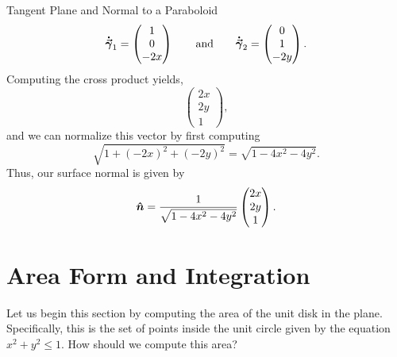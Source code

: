 \begin{ex}{Tangent Plane and Normal to a Paraboloid}
                                        \[
                                        \boldsymbol{\dot{\vec{\gamma}}}_1 = \begin{pmatrix} 1 \\ 0 \\ -2x \end{pmatrix} \qquad \textrm{and} \qquad \boldsymbol{\dot{\vec{\gamma}}}_2 = \begin{pmatrix} 0 \\ 1 \\ -2y \end{pmatrix}.
                                        \]
                                        Computing the cross product yields,
                                        \[
                                        \begin{pmatrix} 2x \\ 2y \\ 1 \end{pmatrix},
                                        \]
                                        and we can normalize this vector by first computing
                                        \[
                                        \sqrt{1+(-2x)^2+(-2y)^2} = \sqrt{1-4x^2-4y^2}.
                                        \]
                                        Thus, our surface normal is given by
                                        \[
                                        \boldsymbol{\hat{n}} = \frac{1}{\sqrt{1-4x^2-4y^2}} \begin{pmatrix} 2x \\ 2y \\ 1 \end{pmatrix}.
                                        \]
                                        \end{ex}
                                      
                                      
                                      \section{Area Form and Integration}
                                      
                                      Let us begin this section by computing the area of the unit disk in the plane.  Specifically, this is the set of points inside the unit circle given by the equation $x^2+y^2\leq 1$.  How should we compute this area?
                                      
